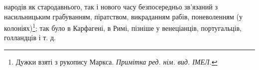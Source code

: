 народів як стародавнього, так і нового часу безпосередньо зв’язаний
з насильницьким грабуванням, піратством, викраданням рабів,
поневоленням (у колоніях)\footnote*{
Дужки взяті з рукопису Маркса. \emph{Примітка ред. нім. вид. ІМЕЛ.}
}; так було в Карфагені, в Римі,
пізніше у венеціанців, португальців, голландців і т. д.
